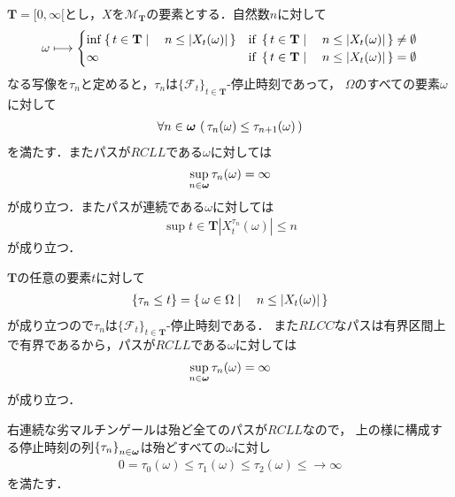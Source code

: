 	\begin{screen}
		\begin{thm}[右連続マルチンゲールから停止時刻の増大列が作れる]
			$\mathbf{T} = [0,\infty[$とし，$X$を$\mathscr{M}_{\mathbf{T}}$の要素とする．自然数$n$に対して
			\begin{align}
				\omega \longmapsto 
				\begin{cases}
					\operatorname*{inf}_{} \left\{\, t \in \mathbf{T} \mid \quad n \leq |X_t(\omega)|\, \right\} & \mbox{if } \left\{\, t \in \mathbf{T} \mid \quad n \leq |X_t(\omega)|\, \right\} \neq \emptyset \\
					\infty & \mbox{if } \left\{\, t \in \mathbf{T} \mid \quad n \leq |X_t(\omega)|\, \right\} = \emptyset
				\end{cases}
			\end{align}
			なる写像を$\tau_n$と定めると，$\tau_n$は$\{\mathscr{F}_t\}_{t \in \mathbf{T}}$-停止時刻であって，
			$\Omega$のすべての要素$\omega$に対して
			\begin{align}
				\forall n \in {\boldsymbol \omega}\, \left(\, \tau_n(\omega) \leq \tau_{n+1}(\omega)\, \right)
			\end{align}
			を満たす．またパスが$RCLL$である$\omega$に対しては
			\begin{align}
				\operatorname*{sup}_{n \in {\boldsymbol \omega}} \tau_n(\omega) = \infty
			\end{align}
			が成り立つ．またパスが連続である$\omega$に対しては
			\begin{align}
				\sup{t \in \mathbf{T}}{\left|X^{\tau_n}_t(\omega)\right|} \leq n
			\end{align}
			が成り立つ．
		\end{thm}
	\end{screen}
	
	\begin{sketch}
		$\mathbf{T}$の任意の要素$t$に対して
		\begin{align}
			\left\{\tau_n \leq t\right\} = \left\{\, \omega \in \Omega \mid \quad n \leq |X_t(\omega)|\, \right\}
		\end{align}
		が成り立つので$\tau_n$は$\{\mathscr{F}_t\}_{t \in \mathbf{T}}$-停止時刻である．
		また$RLCC$なパスは有界区間上で有界であるから，パスが$RCLL$である$\omega$に対しては
		\begin{align}
			\operatorname*{sup}_{n \in {\boldsymbol \omega}} \tau_n(\omega) = \infty
		\end{align}
		が成り立つ．
		\QED
	\end{sketch}
	
	右連続な劣マルチンゲールは殆ど全てのパスが$RCLL$なので，
	上の様に構成する停止時刻の列$\left\{\tau_n\right\}_{n \in {\boldsymbol \omega}}$は殆どすべての$\omega$に対し
	\begin{align}
		0 = \tau_0(\omega) \leq \tau_1(\omega) \leq \tau_2(\omega) \leq \longrightarrow \infty
	\end{align}
	を満たす．
	
